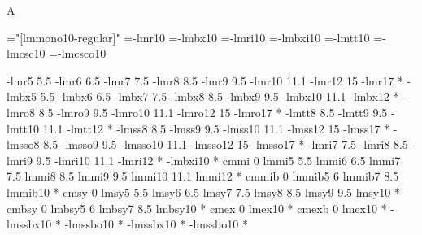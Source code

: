 

\ifx\sizespec\undefined \def\sizespec{}\fi

\ifx\font\corkencoded\else \ifx\font\unicoded\else  \fi\fi
\let\normalmathloading=\relax
\ifx\mathpreloaded A\else  \fi                     

\ifx\font\corkencoded {}\else {}\fi

\ifx\font\unicoded  {} 
   \font\tentt="[lmmono10-regular]"  \sizespec
\else
   \font\tenrm=\tmp-lmr10     \sizespec
   \font\tenbf=\tmp-lmbx10    \sizespec
   \font\tenit=\tmp-lmri10    \sizespec
   \font\tenbi=\tmp-lmbxi10   \sizespec
   \font\tentt=\tmp-lmtt10    \sizespec
   \font\tenrmc=\tmp-lmcsc10  \sizespec
   \font\tenitc=\tmp-lmcsco10 \sizespec
\fi

\tenrm

\def\caps#1{{\escapechar=-1 \expandafter}%
  \expandafter\csname\expandafter\tenonlytext\string#1c\endcsname}
\def\tenonlytext{ten}

\ifx\font\corkencoded {}\else {}\fi

\def\exregtfm #1*{\edef\tmpa{#1*}\expandafter\regtfm\tmpa}

\exregtfm cmr 0 \tmp-lmr5 5.5 \tmp-lmr6 6.5 \tmp-lmr7 7.5 \tmp-lmr8 8.5 
              \tmp-lmr9 9.5 \tmp-lmr10 11.1 \tmp-lmr12 15 \tmp-lmr17 *
\exregtfm cmbx 0 \tmp-lmbx5 5.5 \tmp-lmbx6 6.5 \tmp-lmbx7 7.5 \tmp-lmbx8 8.5 
              \tmp-lmbx9 9.5 \tmp-lmbx10 11.1 \tmp-lmbx12 *
\exregtfm cmsl 0 \tmp-lmro8 8.5 \tmp-lmro9 9.5 \tmp-lmro10 11.1 
              \tmp-lmro12 15 \tmp-lmro17 *
\exregtfm cmtt 0 \tmp-lmtt8 8.5 \tmp-lmtt9 9.5 \tmp-lmtt10 11.1 \tmp-lmtt12 *
\exregtfm cmss 0 \tmp-lmss8 8.5 \tmp-lmss9 9.5 \tmp-lmss10 11.1 \tmp-lmss12 15 
               \tmp-lmss17 *
\exregtfm cmssi 0 \tmp-lmsso8 8.5 \tmp-lmsso9 9.5 \tmp-lmsso10 11.1
                \tmp-lmsso12 15 \tmp-lmsso17 *
\exregtfm cmti 0 \tmp-lmri7 7.5 \tmp-lmri8 8.5 \tmp-lmri9 9.5
                \tmp-lmri10 11.1 \tmp-lmri12 *
\exregtfm cmbxti 0 \tmp-lmbxi10 *
\regtfm cmmi 0 lmmi5 5.5 lmmi6 6.5 lmmi7 7.5 lmmi8 8.5 lmmi9 9.5
              lmmi10 11.1 lmmi12 *
\regtfm cmmib 0 lmmib5 6 lmmib7 8.5 lmmib10 *
\regtfm cmsy 0 lmsy5 5.5 lmsy6 6.5 lmsy7 7.5 lmsy8 8.5 lmsy9 9.5
              lmsy10 *
\regtfm cmbsy 0 lmbsy5 6 lmbsy7 8.5 lmbsy10 *  
\regtfm cmex 0 lmex10 *
\regtfm cmexb 0 lmex10 *
\exregtfm bfsans 0 \tmp-lmssbx10 *
\exregtfm bisans 0 \tmp-lmssbo10 *
\exregtfm bbfsans 0 \tmp-lmssbx10 *
\exregtfm bbisans 0 \tmp-lmssbo10 *

\normalmath \let\normalmathloading=y

\let\lmfonts=\font  %

